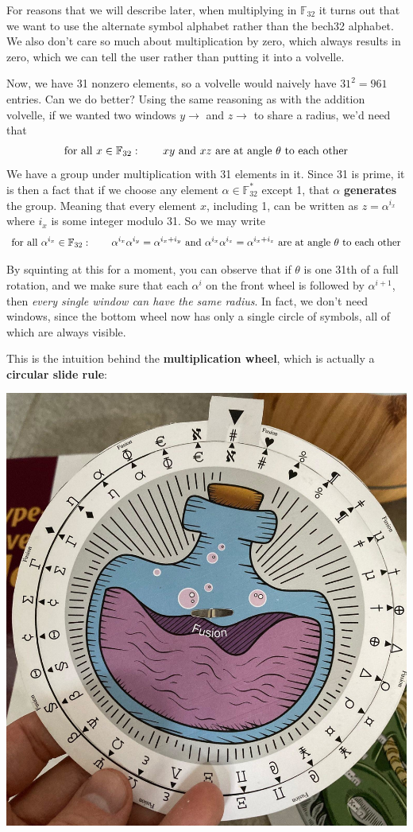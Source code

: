 \documentclass[letterpaper]{article}
\newcommand{\fttwo}{\mathbb{F}_{32}}
\begin{document}
For reasons that we will describe later, when multiplying in $\fttwo$ it turns
out that we want to use the alternate symbol alphabet rather than the bech32
alphabet. We also don't care so much about multiplication by zero, which always
results in zero, which we can tell the user rather than putting it into a
volvelle.

Now, we have 31 nonzero elements, so a volvelle would naively have $31^2=961$
entries. Can we do better? Using the same reasoning as with the addition volvelle,
if we wanted two windows $y\to$ and $z\to$ to share a radius, we'd need that
\[ \textnormal{for all } x\in\fttwo:\qquad xy \textnormal{ and } xz \textnormal{ are at angle $\theta$ to each other} \]
We have a group under multiplication with 31 elements in it. Since 31 is prime, it is then a fact
that if we choose any element $\alpha\in\fttwo^*$ except 1, that $\alpha$
\textbf{generates} the group. Meaning that every element $x$, including 1,
can be written as $z=\alpha^{i_x}$ where $i_x$ is some integer modulo 31. So we
may write
\[ \textnormal{for all } \alpha^{i_x}\in\fttwo:\qquad \alpha^{i_x}\alpha^{i_y} = \alpha^{i_x+i_y} \textnormal{ and } \alpha^{i_x}\alpha^{i_z} = \alpha^{i_x+i_z} \textnormal{ are at angle $\theta$ to each other} \]

By squinting at this for a moment, you can observe that if $\theta$ is one 31th
of a full rotation, and we make sure that each $\alpha^i$ on the front wheel is
followed by $\alpha^{i+1}$, then \emph{every single window can have the same
radius}. In fact, we don't need windows, since the bottom wheel now has only a
single circle of symbols, all of which are always visible.

This is the intuition behind the \textbf{multiplication wheel}, which is actually
a \textbf{circular slide rule}:

\begin{center}\includegraphics[scale=1.00]{images/fusion-wheel.jpg}\end{center}
\end{document}
